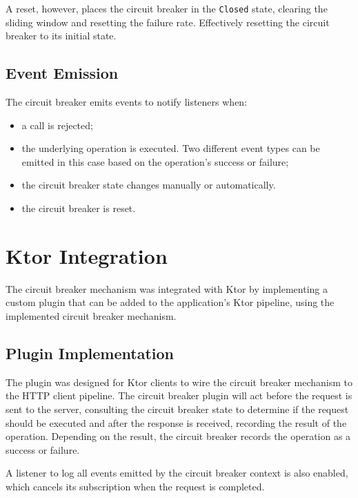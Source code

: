 A reset, however, places the circuit breaker in the \texttt{Closed} state,
clearing the sliding window and resetting the failure rate.
Effectively resetting the circuit breaker to its initial state.

\subsection{Event Emission}\label{subsec:cbreaker-event-emission}

The circuit breaker emits events to notify listeners when:

\begin{itemize}
    \item a call is rejected;
    \item the underlying operation is executed.
    Two different event types can be emitted in this case based on the operation's success or failure;
    \item the circuit breaker state changes manually or automatically.
    \item the circuit breaker is reset.
\end{itemize}


\section{Ktor Integration}\label{sec:cbreaker-ktor-integration}

The circuit breaker mechanism was integrated with Ktor by implementing a custom plugin that can be added to the application's Ktor pipeline, using the implemented circuit breaker mechanism.

\subsection{Plugin Implementation}\label{subsec:cbreaker-plugin}

The plugin was designed for Ktor clients to wire the circuit breaker mechanism to the HTTP client pipeline.
The circuit breaker plugin will act before the request is sent to the server,
consulting the circuit breaker state to determine if the request should be executed and after the response is received,
recording the result of the operation.
Depending on the result, the circuit breaker records the operation as a success or failure.

A listener to log all events emitted by the circuit breaker context is also enabled, which cancels its subscription
when the request is completed.

